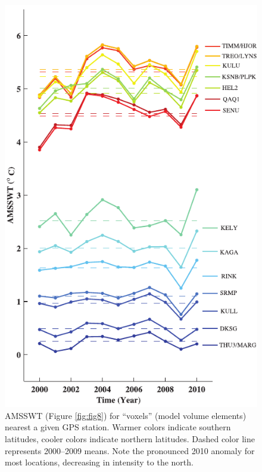 \clearpage
\begin{figure}
 \centering
 \includegraphics{figs_chpt3/2012GC004432-p09.pdf} 
 \caption[AMSSWT (Figure \ref{fig:fig8}) for “voxels” (model volume elements) nearest a given GPS station.]{AMSSWT (Figure \ref{fig:fig8}) for “voxels” (model volume elements) nearest a given GPS station. Warmer colors indicate southern latitudes, cooler colors indicate northern latitudes. Dashed color line represents 2000–2009 means. Note the pronounced 2010 anomaly for most locations, decreasing in intensity to the north.}
 \label{fig:fig9}
\end{figure}

